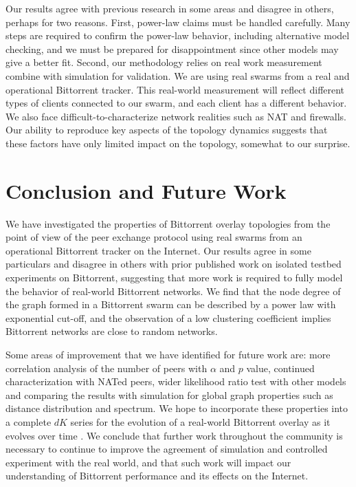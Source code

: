 \documentclass[paper]{ieice}
\begin{document}
Our results agree with previous research \cite{dale2008evolution} in some areas and disagree in others, perhaps for two reasons.
First, power-law claims must be handled carefully. 
Many steps are required to confirm the power-law behavior, including alternative model checking, and we must be prepared for disappointment since other models may give a better fit. 
Second, our methodology relies on real work measurement combine with simulation for validation. 
We are using real swarms from a real and operational Bittorrent tracker. 
This real-world measurement will reflect different types of clients connected to our swarm, and each client has a different behavior. 
We also face difficult-to-characterize network realities such as NAT and firewalls. 
Our ability to reproduce key aspects of the topology dynamics suggests that these factors have only limited impact on the topology, somewhat to our surprise.


\section{Conclusion and Future Work}\label{conclude}
We have investigated the properties of Bittorrent overlay topologies from the point of view of the peer exchange protocol using real swarms from an operational Bittorrent tracker on the Internet. 
Our results agree in some particulars and disagree in others with prior published work on isolated testbed experiments on Bittorrent, suggesting that more work is required to fully model the behavior of real-world Bittorrent networks.
We find that the node degree of the graph formed in a Bittorrent swarm can be described by a power law with exponential cut-off, and the observation of a low clustering coefficient implies Bittorrent networks are close to random networks.

Some areas of improvement that we have identified for future work are: more correlation analysis of the number of peers with $\alpha$ and $p$ value, continued characterization with NATed peers, wider likelihood ratio test with other models and comparing the results with simulation for global graph properties such as distance distribution and spectrum.
We hope to incorporate these properties into a complete $dK$ series for the evolution of a real-world Bittorrent overlay as it evolves over time \cite{mahadevan2006systematic}. 
We conclude that further work throughout the community is necessary to continue to improve the agreement of simulation and controlled experiment with the real world, and that such work will impact our understanding of Bittorrent performance and its effects on the Internet.
\end{document}

